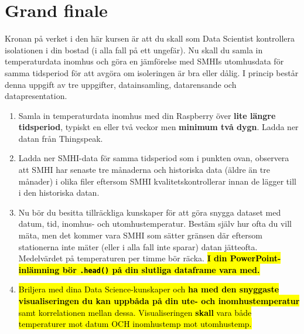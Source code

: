 \documentclass{article}
\begin{document}
\section{Grand finale}\label{grandfinale}
Kronan på verket i den här kursen är att du skall som Data Scientist kontrollera isolationen i din bostad (i alla fall på ett ungefär). Nu skall du samla in temperaturdata inomhus och göra en jämförelse med SMHIs utomhusdata för samma tidsperiod för att avgöra om isoleringen är bra eller dålig. I princip består denna uppgift av tre uppgifter, datainsamling, datarensande och datapresentation.
\begin{enumerate}
    \item Samla in temperaturdata inomhus med din Raspberry över \textbf{lite längre tidsperiod}, typiskt en eller två veckor men \textbf{minimum två dygn}. Ladda ner datan från Thingspeak. 
    \item Ladda ner SMHI-data för samma tidsperiod som i punkten ovan, observera att SMHI har senaste tre månaderna och historiska data (äldre än tre månader) i olika filer eftersom SMHI kvalitetskontrollerar innan de lägger till i den historiska datan. 
    \item Nu bör du besitta tillräckliga kunskaper för att göra snygga dataset med datum, tid, inomhus- och utomhustemperatur. Bestäm själv hur ofta du vill mäta, men det kommer vara SMHI som sätter gränsen där eftersom stationerna inte mäter (eller i alla fall inte sparar) datan jätteofta. Medelvärdet på temperaturen per timme bör räcka. \hl{\textbf{I din PowerPoint-inlämning bör \texttt{.head()} på din slutliga dataframe vara med.}}
    \item \hl{Briljera med dina Data Science-kunskaper och \textbf{ha med den snyggaste visualiseringen du kan uppbåda på din ute- och inomhustemperatur} samt korrelationen mellan dessa. Visualiseringen \textbf{skall} vara både temperaturer mot datum OCH inomhustemp mot utomhustemp. }
\end{enumerate}
\end{document}
